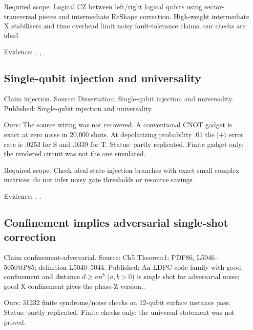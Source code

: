 Required scope: Logical CZ between left/right logical qubits using sector-transversal pieces and intermediate ReShape correction. High-weight intermediate X stabilizers and time overhead limit noisy fault-tolerance claims; our checks are ideal.

Evidence: \href{https://github.com/alectionary/vibe-math/blob/master/formalization/quintavalle-hgp/sources/browser-extraction.txt}{}, \href{https://github.com/alectionary/vibe-math/blob/master/formalization/quintavalle-hgp/availability.md}{}, \href{https://github.com/alectionary/vibe-math/blob/master/formalization/quintavalle-hgp/results/independent_checks.json}{}.
\subsection{Single-qubit injection and universality}\label{claim:injection}
Claim injection. Source: Dissertation: Single-qubit injection and universality. Published: Single-qubit injection and universality.

Ours: The source wiring was not recovered. A conventional CNOT gadget is exact at zero noise in 20,000 shots. At depolarizing probability .01 the $|+\rangle$ error rate is .0253 for S and .0339 for T. Status: partly replicated. Finite gadget only; the rendered circuit was not the one simulated.

Required scope: Check ideal state-injection branches with exact small complex matrices; do not infer noisy gate thresholds or resource savings.

Evidence: \href{https://github.com/alectionary/vibe-math/blob/master/formalization/quintavalle-hgp/sources/browser-extraction.txt}{}, \href{https://github.com/alectionary/vibe-math/blob/master/formalization/quintavalle-hgp/availability.md}{}.
\subsection{Confinement implies adversarial single-shot correction}\label{claim:confinement-adversarial}
Claim confinement-adversarial. Source: Ch5 Theorem1; PDF86, L5046--5050@P85; definition L5040--5044. Published: An LDPC code family with good confinement and distance $d\ge a n^b$ ($a,b>0$) is single shot for adversarial noise; good X confinement gives the phase-Z version..

Ours: 31232 finite syndrome/noise checks on 12-qubit surface instance pass. Status: partly replicated. Finite checks only; the universal statement was not proved.

